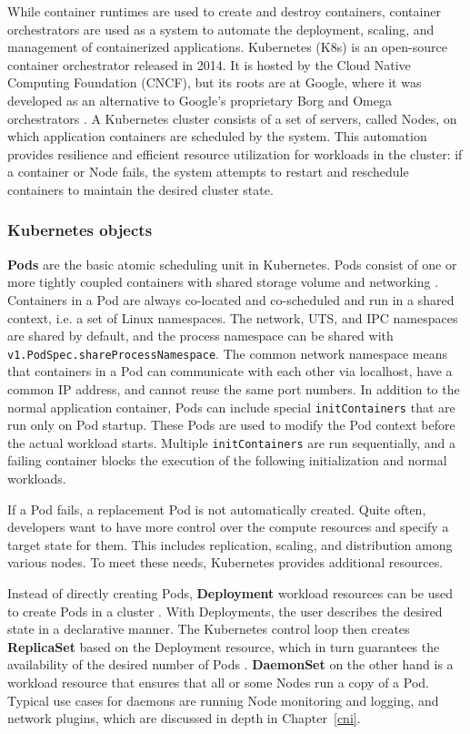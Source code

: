 \documentclass[english, 12pt, a4paper, sci, utf8, a-2b, online]{aaltothesis}
\begin{document}
While container runtimes are used to create and destroy containers, container orchestrators are used as a system to automate the deployment, scaling, and management of containerized applications.
Kubernetes (K8s) \cite{kubernetes} is an open-source container orchestrator released in 2014.
It is hosted by the Cloud Native Computing Foundation (CNCF), but its roots are at Google, where it was developed as an alternative to Google's proprietary Borg and Omega orchestrators \cite{burns2016borg}.
A Kubernetes cluster consists of a set of servers, called Nodes, on which application containers are scheduled by the system.
This automation provides resilience and efficient resource utilization for workloads in the cluster: if a container or Node fails, the system attempts to restart and reschedule containers to maintain the desired cluster state.

\subsubsection{Kubernetes objects}

\textbf{Pods} are the basic atomic scheduling unit in Kubernetes.
Pods consist of one or more tightly coupled containers with shared storage volume and networking \cite{k8s-docs-pods}.
Containers in a Pod are always co-located and co-scheduled and run in a shared context, i.e. a set of Linux namespaces.
The network, UTS, and IPC namespaces are shared by default, and the process namespace can be shared with \lstinline{v1.PodSpec.shareProcessNamespace}.
The common network namespace means that containers in a Pod can communicate with each other via localhost, have a common IP address, and cannot reuse the same port numbers.
In addition to the normal application container, Pods can include special \lstinline{initContainers} that are run only on Pod startup.
These Pods are used to modify the Pod context before the actual workload starts.
Multiple \lstinline{initContainers} are run sequentially, and a failing container blocks the execution of the following initialization and normal workloads.

If a Pod fails, a replacement Pod is not automatically created.
Quite often, developers want to have more control over the compute resources and specify a target state for them.
This includes replication, scaling, and distribution among various nodes.
To meet these needs, Kubernetes provides additional resources.

Instead of directly creating Pods, \textbf{Deployment} workload resources can be used to create Pods in a cluster \cite{k8s-docs-pods}.
With Deployments, the user describes the desired state in a declarative manner.
The Kubernetes control loop then creates \textbf{ReplicaSet} based on the Deployment resource, which in turn guarantees the availability of the desired number of Pods \cite{k8s-docs-deployment}.
\textbf{DaemonSet} on the other hand is a workload resource that ensures that all or some Nodes run a copy of a Pod.
Typical use cases for daemons are running Node monitoring and logging, and network plugins, which are discussed in depth in Chapter~\ref{cni}.
\end{document}
